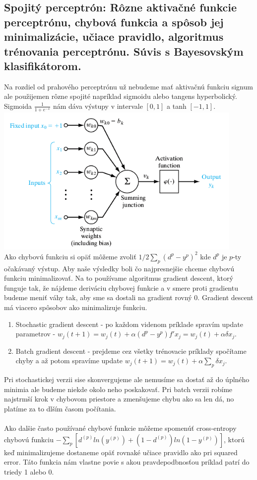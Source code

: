 \documentclass{article}
\numberwithin{equation}{section} %
\begin{document}
\subsection{Spojitý perceptrón: Rôzne aktivačné funkcie perceptrónu, chybová funkcia a spôsob jej minimalizácie, učiace pravidlo, algoritmus trénovania perceptrónu. Súvis s Bayesovským klasifikátorom.}
Na rozdiel od prahového perceptrónu už nebudeme mať aktivačnú funkciu signum ale použijemen rôzne spojité napríklad sigmoidu alebo tangens hyperbolický. Sigmoida $\frac{1}{1 + e^{-x}}$ nám dáva výstupy v intervale $[0, 1]$ a tanh $[-1, 1]$.\\
\includegraphics[width=12cm]{imgs/cont_neuron}\\
Ako chybovú funkciu si opäť môžeme zvoliť $1/2 \sum_p (d^p- y^p)^2$ kde $d^p$ je $p$-ty očakávaný výstup. Aby naše výsledky boli čo najpresnejšie chceme chybovú funkciu minimalizovať. Na to používame algoritmus gradient descent, ktorý funguje tak, že nájdeme deriváciu chybovej funkcie a v smere proti gradientu budeme meniť váhy tak, aby sme sa dostali na gradient rovný 0. Gradient descent má viacero spôsobov ako minimalizuje funkciu.
\begin{enumerate}
\item Stochastic gradient descent - po každom videnom príklade spravím update parametrov - $w_j(t+1) = w_j(t) + \alpha(d^p - y^p)f'x_j = w_j(t) + \alpha\delta x_j$. 
\item Batch gradient descent - prejdeme cez všetky trénovacie príklady spočítame chyby a až potom spravíme update $w_j(t+1) = w_j(t) + \alpha \sum_p \delta x_j$.
\end{enumerate}
Pri stochastickej verzii sise skonvergujeme ale nemusíme sa dostať až do úplného minimia ale budeme niekde okolo neho poskakovať. Pri batch verzii robíme najstrmší krok v chybovom priestore a zmenšujeme chybu ako sa len dá, no platíme za to dlším časom počítania. \\\\
Ako dalšie často používané chybové funkcie môžeme spomenúť cross-entropy chybovú funkciu $-\sum_p [d^{(p)} ln (y^{(p)}) + (1 - d^{(p)})ln(1-y^{(p)})]$, ktorú keď minimalizujeme dostaneme opäť rovnaké učiace pravidlo ako pri squared error. Táto funkcia nám vlastne povie s akou pravdepodbnosťou príklad patrí do triedy 1 alebo 0.
\end{document}
